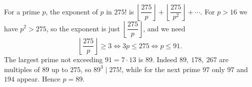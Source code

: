 For a prime $p$, the exponent of $p$ in $275!$ is $\left\lfloor\dfrac{275}{p}\right\rfloor+\left\lfloor\dfrac{275}{p^2}\right\rfloor+\cdots$. For $p>16$ we have $p^2>275$, so the exponent is just $\left\lfloor\dfrac{275}{p}\right\rfloor$, and we need
\[
\left\lfloor\dfrac{275}{p}\right\rfloor\ge3\iff 3p\le275\iff p\le91 .
\]
The largest prime not exceeding $91=7\cdot13$ is $89$. Indeed $89,\ 178,\ 267$ are multiples of $89$ up to $275$, so $89^3\mid275!$, while for the next prime $97$ only $97$ and $194$ appear. Hence $p=\boxed{89}$.
